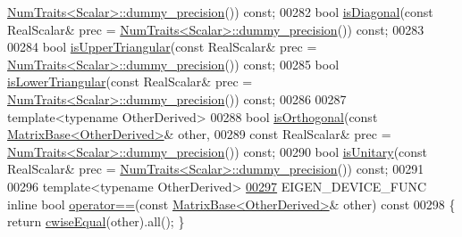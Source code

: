 \begin{DoxyCode}
      \hyperlink{group___core___module_struct_eigen_1_1_num_traits}{NumTraits<Scalar>::dummy\_precision}()) \textcolor{keyword}{const};
00282     \textcolor{keywordtype}{bool} \hyperlink{group___core___module_a97027ea54c8cd1ddb1c578fee5cedc67}{isDiagonal}(\textcolor{keyword}{const} RealScalar& prec = 
      \hyperlink{group___core___module_struct_eigen_1_1_num_traits}{NumTraits<Scalar>::dummy\_precision}()) \textcolor{keyword}{const};
00283 
00284     \textcolor{keywordtype}{bool} \hyperlink{group___core___module_aae3ec1660bb4ac584220481c54ab4a64}{isUpperTriangular}(\textcolor{keyword}{const} RealScalar& prec = 
      \hyperlink{group___core___module_struct_eigen_1_1_num_traits}{NumTraits<Scalar>::dummy\_precision}()) \textcolor{keyword}{const};
00285     \textcolor{keywordtype}{bool} \hyperlink{group___core___module_a1e96c42d79a56f0a6ade30ce031e17eb}{isLowerTriangular}(\textcolor{keyword}{const} RealScalar& prec = 
      \hyperlink{group___core___module_struct_eigen_1_1_num_traits}{NumTraits<Scalar>::dummy\_precision}()) \textcolor{keyword}{const};
00286 
00287     \textcolor{keyword}{template}<\textcolor{keyword}{typename} OtherDerived>
00288     \textcolor{keywordtype}{bool} \hyperlink{group___core___module_aefdc8e4e4c156fdd79a21479e75dcd8a}{isOrthogonal}(\textcolor{keyword}{const} \hyperlink{group___core___module_class_eigen_1_1_matrix_base}{MatrixBase<OtherDerived>}& other,
00289                       \textcolor{keyword}{const} RealScalar& prec = 
      \hyperlink{group___core___module_struct_eigen_1_1_num_traits}{NumTraits<Scalar>::dummy\_precision}()) \textcolor{keyword}{const};
00290     \textcolor{keywordtype}{bool} \hyperlink{group___core___module_a8a7ee34ce202cac3eeea9cf20c9e4833}{isUnitary}(\textcolor{keyword}{const} RealScalar& prec = 
      \hyperlink{group___core___module_struct_eigen_1_1_num_traits}{NumTraits<Scalar>::dummy\_precision}()) \textcolor{keyword}{const};
00291 
00296     \textcolor{keyword}{template}<\textcolor{keyword}{typename} OtherDerived>
\hyperlink{group___core___module_a0f555511cb0f8ccbbb0e6c597c4cf412}{00297}     EIGEN\_DEVICE\_FUNC \textcolor{keyword}{inline} \textcolor{keywordtype}{bool} \hyperlink{group___core___module_a0f555511cb0f8ccbbb0e6c597c4cf412}{operator==}(\textcolor{keyword}{const} 
      \hyperlink{group___core___module_class_eigen_1_1_matrix_base}{MatrixBase<OtherDerived>}& other)\textcolor{keyword}{ const}
00298 \textcolor{keyword}{    }\{ \textcolor{keywordflow}{return} \hyperlink{group___core___module_a1d63c6dd2c0c6c8186fdabdf55ee1f58}{cwiseEqual}(other).all(); \}

\end{DoxyCode}
